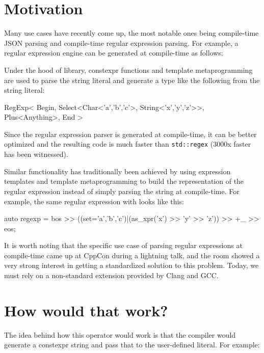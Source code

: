 \documentclass{wg21}
\newcommand{\cc}[1]{\texttt{#1}}
\begin{document}
\section{Motivation}
Many use cases have recently come up, the most notable ones being compile-time
JSON parsing and compile-time regular expression parsing. For example, a
regular expression engine can be generated at compile-time as follows:


Under the hood of \cite{CTRE} library, constexpr functions and template 
metaprogramming are used to parse the string literal and generate a type
like the following from the string literal:

\begin{cpp}
RegExp<
  Begin,
  Select<Char<'a','b','c'>, String<'x','y','z'>>,
  Plus<Anything>,
  End
>
\end{cpp}

Since the regular expression parser is generated at compile-time, it can be
better optimized and the resulting code is much faster than \cc{std::regex}
(3000x faster has been witnessed).

Similar functionality has traditionally been achieved by using expression
templates and template metaprogramming to build the representation of the
regular expression instead of simply parsing the string at compile-time.
For example, the same regular expression with \cite{Boost.Xpressive} looks
like this:

\begin{cpp}
auto regexp = bos >> ((set='a','b','c')|(as_xpr('x') >> 'y' >> 'z')) >> +_ >> eos;
\end{cpp}

It is worth noting that the specific use case of parsing regular expressions
at compile-time came up at CppCon during a lightning talk, and the room showed
a very strong interest in getting a standardized solution to this problem.
Today, we must rely on a non-standard extension provided by Clang and GCC.


\section{How would that work?}
The idea behind how this operator would work is that the compiler would
generate a constexpr string and pass that to the user-defined literal.
For example:
\end{document}
